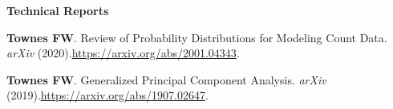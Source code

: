\documentclass[10pt]{article}
\newcommand\doilink[1]{\href{https://dx.doi.org/#1}{#1}}
\newcommand\doi[1]{doi:\doilink{#1}}
\newcommand\arxiv[1]{\url{https://arxiv.org/abs/#1}}
\begin{document}
\textbf{Technical Reports}
\begin{enumerate}[label= {[\arabic*]}]
\item {\bf Townes FW}. Review of Probability Distributions for Modeling Count Data. {\it arXiv} (2020).\newline \arxiv{2001.04343}.
\item {\bf Townes FW}. Generalized Principal Component Analysis. {\it arXiv} (2019).\newline \arxiv{1907.02647}.
\end{enumerate}

\end{document}
